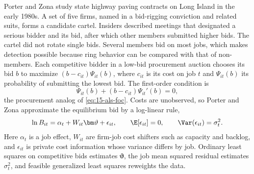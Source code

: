 Porter and Zona study state highway paving contracts on Long Island in the early 1980s. A set of five firms,
named in a bid-rigging conviction and related suits, forms a candidate cartel. Insiders described meetings
that designated a serious bidder and its bid, after which other members submitted higher bids. The cartel
did not rotate single bids. Several members bid on most jobs, which makes detection possible because ring
behavior can be compared with that of non-members. Each competitive bidder in a low-bid procurement auction
chooses its bid $b$ to maximize $(b-c_{it})\Psi_{it}(b)$, where $c_{it}$ is its cost on job $t$ and
$\Psi_{it}(b)$ its probability of submitting the lowest bid. The first-order condition is
\[
\Psi_{it}(b)+(b-c_{it})\Psi_{it}'(b)=0 ,
\]
the procurement analog of \eqref{eq:15-als-foc}. Costs are unobserved, so Porter and Zona approximate the
equilibrium bid by a log-linear rule,
\begin{equation}\label{eq:15-pz-bid}
\ln B_{it}=\alpha_t+W_{it}\bm\vartheta+\epsilon_{it},\qquad\E[\epsilon_{it}]=0,\qquad\Var(\epsilon_{it})=\sigma_t^2 .
\end{equation}
Here $\alpha_t$ is a job effect, $W_{it}$ are firm-job cost shifters such as capacity and backlog, and
$\epsilon_{it}$ is private cost information whose variance differs by job. Ordinary least squares on competitive bids
estimates $\bm\vartheta$, the job mean squared residual estimates $\sigma_t^2$, and feasible generalized
least squares reweights the data.

